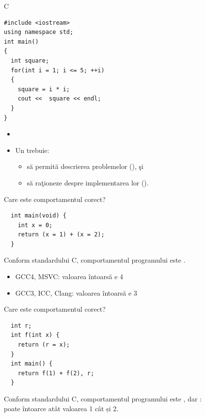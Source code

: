 \documentclass[xcolor=x11names,compress,10pt]{beamer}
\begin{document}
\begin{frame}[fragile]{C}
\begin{verbatim}
#include <iostream> 
using namespace std;
int main() 
{
  int square; 
  for(int i = 1; i <= 5; ++i)
  { 
    square = i * i;
    cout <<  square << endl; 
  }
}
\end{verbatim}

\begin{itemize}
	\pause \vspace{-.4cm}
	\item {} \pause {}
	\vspace{.2cm}
	\pause
	\item Un  trebuie:
	\begin{itemize}
		\item s\u a permit\u a descrierea problemelor (), \c si
		\item s\u a ra\c tioneze despre implementarea lor ().
	\end{itemize}
\end{itemize}

\end{frame}

\begin{frame}[fragile]{Care este comportamentul corect?}

\begin{verbatim}
  int main(void) {
    int x = 0;
    return (x = 1) + (x = 2);
  }
\end{verbatim}
Conform standardului C, comportamentul programului este .
\begin{itemize}
\item GCC4, MSVC: valoarea întoarsă e \alert{4}
\item GCC3, ICC, Clang: valoarea întoarsă e \alert{3}
\end{itemize}
\end{frame}

\begin{frame}[fragile]{Care este comportamentul corect?}

\begin{verbatim}
  int r; 
  int f(int x) {
    return (r = x);
  }
  int main() {
    return f(1) + f(2), r;
  }
\end{verbatim}

 Conform standardului C, comportamentul programului este , dar :\\
poate întoarce atât valoarea \alert{1} cât și \alert{2}.
\end{frame}
\end{document}
